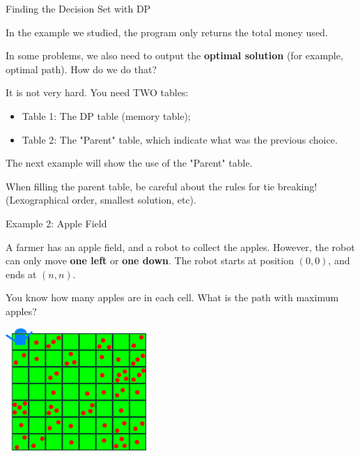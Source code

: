 \begin{frame}{Finding the Decision Set with DP}

  In the example we studied, the program only returns the total money used.\bigskip

  In some problems, we also need to output the {\bf optimal solution} (for example, optimal path). How do we do that?
  \bigskip

  It is not very hard. You need TWO tables:
  \begin{itemize}
    \item Table 1: The DP table (memory table);
    \item Table 2: The "Parent" table, which indicate what was the previous choice.
  \end{itemize}
  \bigskip

  The next example will show the use of the "Parent" table. \bigskip

  \begin{block}{}
    When filling the parent table, be careful about the rules for tie breaking!\\
    (Lexographical order, smallest solution, etc).
  \end{block}
\end{frame}

\begin{frame}{Example 2: Apple Field}
  \begin{block}{}
  {\smaller
  A farmer has an apple field, and a robot to collect the apples. However, the robot can only move {\bf one left} or {\bf one down}. The robot starts at position $(0,0)$, and ends at $(n,n)$.\medskip

  You know how many apples are in each cell. What is the path with maximum apples?
}
  \end{block}

  \begin{center}
    \includegraphics[width=0.4\textwidth]{../img/applefield}
  \end{center}
\end{frame}

